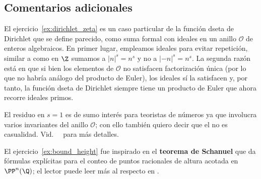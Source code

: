 \documentclass[11pt, reqno]{amsart}
\begin{document}
\begin{additional}
\appendix
\section{Comentarios adicionales}
El ejercicio~\ref{ex:dirichlet_zeta} es un caso particular de la función dseta de Dirichlet que se define parecido, como suma formal con
ideales en un anillo $\mathcal{O}$ de enteros algebraicos.
En primer lugar, empleamos ideales para evitar repetición, similar a como en $\Z$ sumamos a $|n|^s = n^s$ y no a $\lvert-n\rvert^s = n^s$.
La segunda razón está en que si bien los elementos de $\mathcal{O}$ no satisfacen factorización única (por lo que no habría análogo del
producto de Euler), los ideales sí la satisfacen y, por tanto, la función dseta de Dirichlet siempre tiene un producto de Euler que ahora
recorre ideales primos.

El residuo en $s = 1$ es de sumo interés para teoristas de números ya que involucra varios invariantes del anillo $\mathcal{O}$;
con ello también quiero decir que el \textquote{$\pi$} no es casualidad.
Vid.\ \citeauthor{lang:algebraic}~\cite[259]{lang:algebraic} para más detalles.

El ejercicio~\ref{ex:bound_height} fue inspirado en el \textbf{teorema de Schanuel} que da fórmulas explícitas para el conteo de puntos
racionales de altura acotada en $\PP^n(\Q)$;
el lector puede leer más al respecto en \cite{hindry:diophantine}.

\printbibliography[title={Referencias y lecturas adicionales}]
\end{additional}
\end{document}
